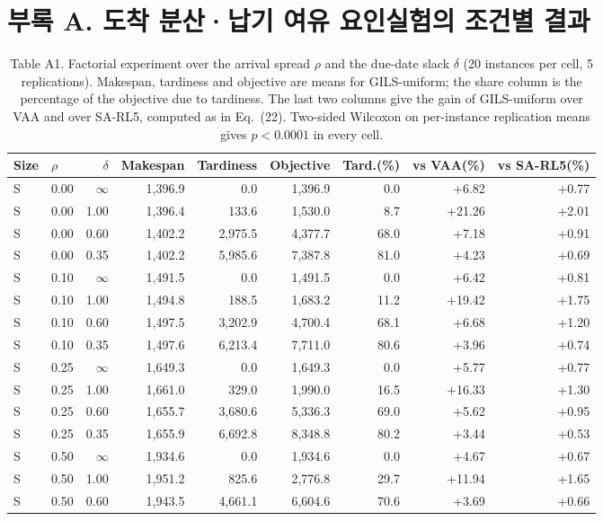 \documentclass[10pt,a4paper]{article}
\begin{document}
\section*{부록 A. 도착 분산·납기 여유 요인실험의 조건별 결과}
\begin{table}[H]\centering
\caption{Table A1. Factorial experiment over the arrival spread $\rho$ and the due-date slack $\delta$ (20 instances per cell, 5 replications). Makespan, tardiness and objective are means for GILS-uniform; the share column is the percentage of the objective due to tardiness. The last two columns give the gain of GILS-uniform over VAA and over SA-RL5, computed as in Eq.~(22). Two-sided Wilcoxon on per-instance replication means gives $p<0.0001$ in every cell.}
\label{tab:tweff-full}\footnotesize\setlength{\tabcolsep}{4pt}
\begin{tabular}{@{}llrrrrrrr@{}}
\toprule
Size & $\rho$ & $\delta$ & Makespan & Tardiness & Objective & Tard.(\%) & vs VAA(\%) & vs SA-RL5(\%) \\
\midrule
S & 0.00 & $\infty$ & 1,396.9 & 0.0 & 1,396.9 & 0.0 & +6.82 & +0.77\\
S & 0.00 & 1.00 & 1,396.4 & 133.6 & 1,530.0 & 8.7 & +21.26 & +2.01\\
S & 0.00 & 0.60 & 1,402.2 & 2,975.5 & 4,377.7 & 68.0 & +7.18 & +0.91\\
S & 0.00 & 0.35 & 1,402.2 & 5,985.6 & 7,387.8 & 81.0 & +4.23 & +0.69\\
S & 0.10 & $\infty$ & 1,491.5 & 0.0 & 1,491.5 & 0.0 & +6.42 & +0.81\\
S & 0.10 & 1.00 & 1,494.8 & 188.5 & 1,683.2 & 11.2 & +19.42 & +1.75\\
S & 0.10 & 0.60 & 1,497.5 & 3,202.9 & 4,700.4 & 68.1 & +6.68 & +1.20\\
S & 0.10 & 0.35 & 1,497.6 & 6,213.4 & 7,711.0 & 80.6 & +3.96 & +0.74\\
S & 0.25 & $\infty$ & 1,649.3 & 0.0 & 1,649.3 & 0.0 & +5.77 & +0.77\\
S & 0.25 & 1.00 & 1,661.0 & 329.0 & 1,990.0 & 16.5 & +16.33 & +1.30\\
S & 0.25 & 0.60 & 1,655.7 & 3,680.6 & 5,336.3 & 69.0 & +5.62 & +0.95\\
S & 0.25 & 0.35 & 1,655.9 & 6,692.8 & 8,348.8 & 80.2 & +3.44 & +0.53\\
S & 0.50 & $\infty$ & 1,934.6 & 0.0 & 1,934.6 & 0.0 & +4.67 & +0.67\\
S & 0.50 & 1.00 & 1,951.2 & 825.6 & 2,776.8 & 29.7 & +11.94 & +1.65\\
S & 0.50 & 0.60 & 1,943.5 & 4,661.1 & 6,604.6 & 70.6 & +3.69 & +0.66\\

\end{tabular}
\end{table}
\end{document}
